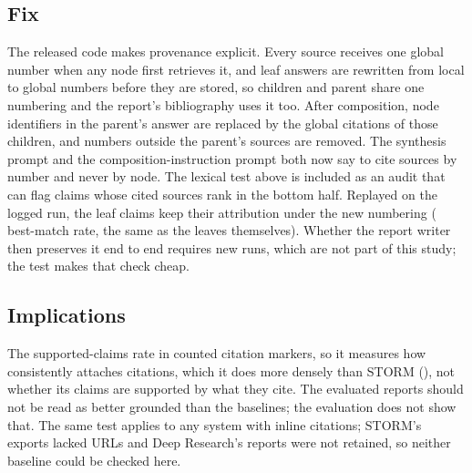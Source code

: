 \subsection{Fix}
The released code makes provenance explicit. Every source receives one global number when any node first retrieves it, and leaf answers are rewritten from local to global numbers before they are stored, so children and parent share one numbering and the report's bibliography uses it too. After composition, node identifiers in the parent's answer are replaced by the global citations of those children, and numbers outside the parent's sources are removed. The synthesis prompt and the composition-instruction prompt both now say to cite sources by number and never by node. The lexical test above is included as an audit that can flag claims whose cited sources rank in the bottom half. Replayed on the logged run, the leaf claims keep their attribution under the new numbering (\atFixBestCited{} best-match rate, the same as the leaves themselves). Whether the report writer then preserves it end to end requires new runs, which are not part of this study; the test makes that check cheap.

\subsection{Implications}
The supported-claims rate in  counted citation markers, so it measures how consistently \sys{} attaches citations, which it does more densely than STORM (), not whether its claims are supported by what they cite. The evaluated reports should not be read as better grounded than the baselines; the evaluation does not show that. The same test applies to any system with inline citations; STORM's exports lacked URLs and Deep Research's reports were not retained, so neither baseline could be checked here.
